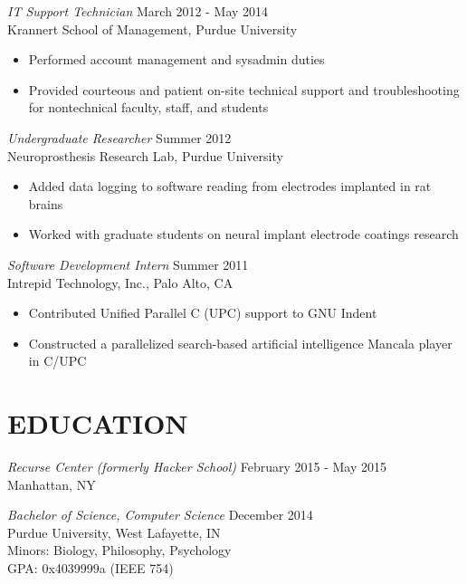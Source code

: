 \documentclass[margin,5pt]{res} %
\begin{document}
\begin{resume}
	{\sl IT Support Technician} \hfill March 2012 - May 2014 \\
         	Krannert School of Management, Purdue University
		\begin{itemize} \itemsep -2pt
	      \item Performed account management and sysadmin duties 
           \item Provided courteous and patient on-site technical support and troubleshooting for nontechnical faculty, staff, and students
		\end{itemize}

	{\sl Undergraduate Researcher} \hfill Summer 2012\\
          Neuroprosthesis Research Lab, Purdue University
	    	\begin{itemize} \itemsep -2pt
	    	\item Added data logging to software reading from electrodes implanted in rat brains
	    	\item Worked with graduate students on neural implant electrode coatings research
	    	\end{itemize}

	{\sl Software Development Intern} \hfill Summer 2011\\
          Intrepid Technology, Inc., Palo Alto, CA
          \begin{itemize}  \itemsep -2pt
		\item Contributed Unified Parallel C (UPC) support to GNU Indent
		\item Constructed a parallelized search-based artificial intelligence Mancala player in C/UPC
		\end{itemize}


\section{EDUCATION}
	{\sl Recurse Center (formerly Hacker School)} \hfill February 2015 - May 2015\\
		Manhattan, NY

	{\sl Bachelor of Science, Computer Science }\hfill  December 2014\\
		Purdue University, West Lafayette, IN\\
		Minors: Biology, Philosophy, Psychology \\
		GPA: 0x4039999a (IEEE 754)



\end{resume}
\end{document}

